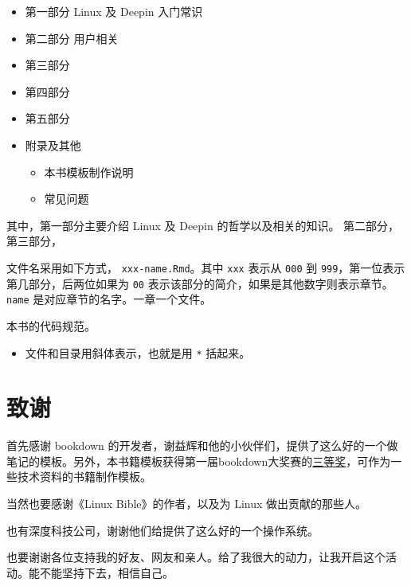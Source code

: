 \documentclass[doctor,openright,twoside]{sjtuthesis}
\providecommand{\tightlist}{%
    \setlength{\itemsep}{0pt}\setlength{\parskip}{0pt}}
\newcommand{\passthrough}[1]{#1}
\theoremstyle{plain}
\theoremstyle{definition}
\theoremstyle{remark}
\theoremstyle{ocrenumbox}
\theoremstyle{plain}
\begin{document}
\begin{itemize}
\tightlist
\item
  第一部分 Linux 及 Deepin 入门常识
\item
  第二部分 用户相关
\item
  第三部分
\item
  第四部分
\item
  第五部分
\item
  附录及其他

  \begin{itemize}
  \tightlist
  \item
    本书模板制作说明
  \item
    常见问题
  \end{itemize}
\end{itemize}

其中，第一部分主要介绍 Linux 及 Deepin 的哲学以及相关的知识。
第二部分，第三部分，

文件名采用如下方式， \passthrough{\lstinline!xxx-name.Rmd!}。其中 \passthrough{\lstinline!xxx!} 表示从 \passthrough{\lstinline!000!} 到 \passthrough{\lstinline!999!}，第一位表示第几部分，后两位如果为 \passthrough{\lstinline!00!} 表示该部分的简介，如果是其他数字则表示章节。\passthrough{\lstinline!name!} 是对应章节的名字。一章一个文件。

本书的代码规范。

\begin{itemize}
\tightlist
\item
  文件和目录用斜体表示，也就是用 \passthrough{\lstinline!*!} 括起来。
\end{itemize}



\hypertarget{section-1}{%
\chapter{致谢}\label{section-1}}

首先感谢 bookdown 的开发者，谢益辉和他的小伙伴们，提供了这么好的一个做笔记的模板。另外，本书籍模板获得第一届bookdown大奖赛的\href{https://community.rstudio.com/t/announcing-winners-of-the-1st-bookdown-contest/16394}{三等奖}，可作为一些技术资料的书籍制作模板。

当然也要感谢《Linux Bible》的作者，以及为 Linux 做出贡献的那些人。

也有深度科技公司，谢谢他们给提供了这么好的一个操作系统。

也要谢谢各位支持我的好友、网友和亲人。给了我很大的动力，让我开启这个活动。能不能坚持下去，相信自己。
\end{document}
